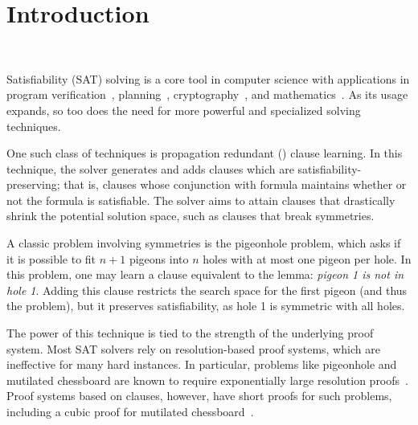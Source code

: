 \section{Introduction}~\label{sec:intro}


Satisfiability (SAT) solving is a core tool in computer science with applications in program verification~\cite{BillionQueries,sat-hardwareverification,ic3,bmc}, planning~\cite{planning,planningassat}, cryptography~\cite{cryptominisat}, and mathematics~\cite{chromaticnumber,pythagoreantriples,kellersconjecture,emptyhexagon}. As its usage expands, so too does the need for more powerful and specialized solving techniques.



One such class of techniques is propagation redundant (\pr) clause learning. In this technique, the solver generates and adds clauses which are satisfiability-preserving; that is, clauses whose conjunction with formula maintains whether or not the formula is satisfiable. The solver aims to attain clauses that drastically shrink the potential solution space, such as clauses that break symmetries.

A classic problem involving symmetries is the pigeonhole problem, which asks if it is possible to fit $n+1$ pigeons into $n$ holes with at most one pigeon per hole. In this problem, one may learn a clause equivalent to the lemma: \emph{pigeon 1 is not in hole 1}. Adding this clause restricts the search space for the first pigeon (and thus the problem), but it preserves satisfiability, as hole 1 is symmetric with all holes.



The power of this technique is tied to the strength of the underlying proof system. Most SAT solvers rely on resolution-based proof systems, which are ineffective for many hard instances. In particular, problems like pigeonhole and mutilated chessboard are known to require exponentially large resolution proofs~\cite{hakenpigeonhole,mutilatedchessboard-exponential}. Proof systems based on \pr clauses, however, have short proofs for such problems, including a cubic proof for mutilated chessboard~\cite{mutilatedchessboard-pr}.

